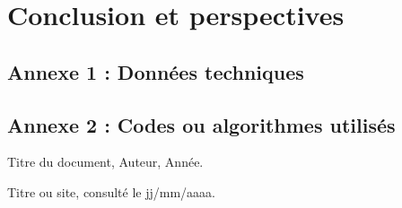 \documentclass[12pt,a4paper]{report}
\begin{document}

\chapter{Conclusion et perspectives}





\appendix

\section{Annexe 1 : Données techniques}
\section{Annexe 2 : Codes ou algorithmes utilisés}


\begin{thebibliography}{9}

Titre du document, Auteur, Année.


Titre ou site, consulté le jj/mm/aaaa.


\end{thebibliography}
\end{document}
